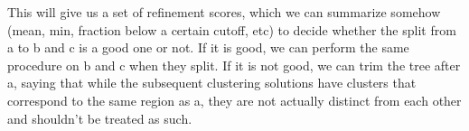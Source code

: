 \documentclass[11pt]{article}
\begin{document}
This will give us a set of refinement scores, which we can summarize somehow (mean, min, fraction below a certain cutoff, etc) to decide whether the split from a to b and c is a good one or not.
If it is good, we can perform the same procedure on b and c when they split.
If it is not good, we can trim the tree after a, saying that while the subsequent clustering solutions have clusters that correspond to the same region as a, they are not actually distinct from each other and shouldn't be treated as such.
\end{document}
